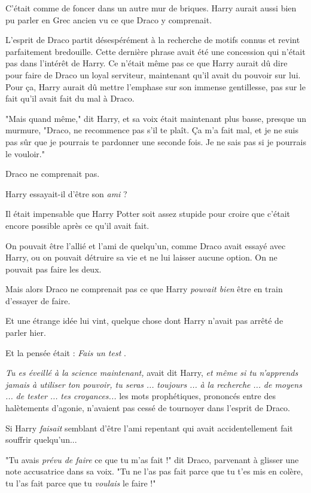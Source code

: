 C'était comme de foncer dans un autre mur de briques. Harry aurait aussi bien pu parler en Grec ancien vu ce que Draco y comprenait.

L'esprit de Draco partit désespérément à la recherche de motifs connus et revint parfaitement bredouille. Cette dernière phrase avait été une concession qui n'était pas dans l'intérêt de Harry. Ce n'était même pas ce que Harry aurait dû dire pour faire de Draco un loyal serviteur, maintenant qu'il avait du pouvoir sur lui. Pour ça, Harry aurait dû mettre l'emphase sur son immense gentillesse, pas sur le fait qu'il avait fait du mal à Draco.

"Mais quand même," dit Harry, et sa voix était maintenant plus basse, presque un murmure, "Draco, ne recommence pas s'il te plaît. Ça m'a fait mal, et je ne suis pas sûr que je pourrais te pardonner une seconde fois. Je ne sais pas si je pourrais le vouloir."

Draco ne comprenait pas.

Harry essayait-il d'être son \emph{ami}  ?

Il était impensable que Harry Potter soit assez stupide pour croire que c'était encore possible après ce qu'il avait fait.

On pouvait être l'allié et l'ami de quelqu'un, comme Draco avait essayé avec Harry, ou on pouvait détruire sa vie et ne lui laisser aucune option. On ne pouvait pas faire les deux.

Mais alors Draco ne comprenait pas ce que Harry \emph{pouvait bien}  être en train d'essayer de faire.

Et une étrange idée lui vint, quelque chose dont Harry n'avait pas arrêté de parler hier.

Et la pensée était : \emph{Fais un test} .

\emph{Tu es éveillé à la science maintenant,}  avait dit Harry, \emph{et même si tu n'apprends jamais à utiliser ton pouvoir, tu seras} \emph{...} \emph{ toujours} \emph{...} \emph{ à la recherche} \emph{...} \emph{ de moyens} \emph{...} \emph{ de tester} \emph{...} \emph{ tes croyances... } les mots prophétiques, prononcés entre des halètements d'agonie, n'avaient pas cessé de tournoyer dans l'esprit de Draco.

Si Harry \emph{faisait}  semblant d'être l'ami repentant qui avait accidentellement fait souffrir quelqu'un...

"Tu avais \emph{prévu de faire } ce que tu m'as fait !" dit Draco, parvenant à glisser une note accusatrice dans sa voix. "Tu ne l'as pas fait parce que tu t'es mis en colère, tu l'as fait parce que tu \emph{voulais}  le faire !"


